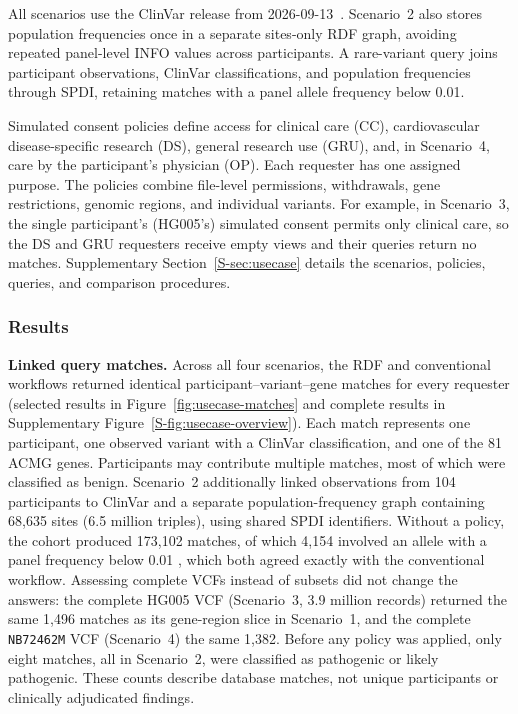 \documentclass[pdflatex,sn-mathphys-num]{sn-jnl}
\begin{document}
All scenarios use the ClinVar release from 2026-09-13~\cite{clinvar_vcf}.
Scenario~2 also stores population frequencies once in a separate sites-only RDF graph, avoiding repeated panel-level INFO values across participants.
A rare-variant query joins participant observations, ClinVar classifications, and population frequencies through SPDI, retaining matches with a panel allele frequency below 0.01.

Simulated consent policies define access for clinical care (CC), cardiovascular disease-specific research (DS), general research use (GRU), and, in Scenario~4, care by the participant's physician (OP).
Each requester has one assigned purpose.
The policies combine file-level permissions, withdrawals, gene restrictions, genomic regions, and individual variants.
For example, in Scenario~3, the single participant’s (HG005’s) simulated consent permits only clinical care, so the DS and GRU requesters receive empty views and their queries return no matches.
Supplementary Section~\ref{S-sec:usecase} details the scenarios, policies, queries, and comparison procedures.

\subsubsection{Results}
\textbf{Linked query matches.}
Across all four scenarios, the RDF and conventional workflows returned identical participant--variant--gene matches for every requester (selected results in Figure~\ref{fig:usecase-matches} and complete results in Supplementary Figure~\ref{S-fig:usecase-overview}).
Each match represents one participant, one observed variant with a ClinVar classification, and one of the 81 ACMG genes.
Participants may contribute multiple matches, most of which were classified as benign.
Scenario~2 additionally linked observations from 104 participants to ClinVar and a separate population-frequency graph containing 68,635 sites (6.5 million triples), using shared SPDI identifiers.
Without a policy, the cohort produced 173,102 matches, of which 4,154 involved an allele with a panel frequency below 0.01 , which both agreed exactly with the conventional workflow.
Assessing complete VCFs instead of subsets did not change the answers: the complete HG005 VCF (Scenario~3, 3.9 million records) returned the same 1,496 matches as its gene-region slice in Scenario~1, and the complete \texttt{NB72462M} VCF (Scenario~4) the same 1,382.
Before any policy was applied, only eight matches, all in Scenario~2, were classified as pathogenic or likely pathogenic.
These counts describe database matches, not unique participants or clinically adjudicated findings.
\end{document}
